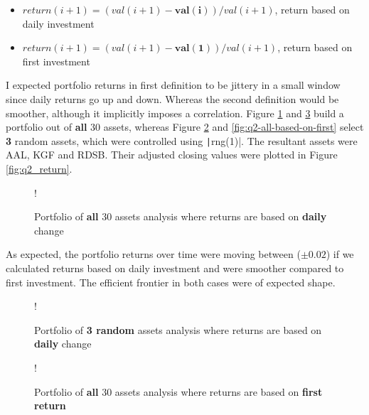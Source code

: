\documentclass[11pt]{article}
\begin{document}
\begin{itemize}
	\item $return(i+1) = (val(i+1) - \bm{val(i)})/val(i+1)$, return based on daily investment
	\item $return(i+1) = (val(i+1) - \bm{val(1)})/val(i+1)$, return based on first investment
\end{itemize}

I expected portfolio returns in first definition to be jittery in a small window since daily returns
go up and down. Whereas the second definition would be smoother, although it implicitly imposes a correlation. 
Figure \ref{fig:q2-all-assets-all-based-on-daily} and \ref{fig:q2-all-assets-all-based-on-first} build a portfolio out of \textbf{all} 30 assets, whereas
Figure \ref{fig:q2-all-based-on-daily} and \ref{fig:q2-all-based-on-first} select \textbf{3} random assets,
which were controlled using \texttt|rng(1)|. The resultant assets were AAL, KGF and RDSB.
Their adjusted closing values were plotted in Figure \ref{fig:q2_return}.

\begin{figure}[!h]
   \centering 
 	\resizebox {\textwidth} {!} { }
    \caption{Portfolio of \textbf{all} 30 assets analysis where returns are based on \textbf{daily} change}
	\label{fig:q2-all-assets-all-based-on-daily}
	\vspace{-0.3cm}
\end{figure}

As expected, the portfolio returns over time were moving between ($\pm0.02$) if we calculated returns
based on daily investment and were smoother compared to first investment. The efficient frontier in
both cases were of expected shape.

\begin{figure}[!h]
   \centering 
 	\resizebox {\textwidth} {!} { }
    \caption{Portfolio of \textbf{3 random} assets analysis where returns are based on \textbf{daily} change}
	\label{fig:q2-all-based-on-daily}
	\vspace{-0.3cm}
\end{figure}

\begin{figure}[!h]
   \centering 
 	\resizebox {\textwidth} {!} { }
    \caption{Portfolio of \textbf{all} 30 assets analysis where returns are based on \textbf{first return}}
	\label{fig:q2-all-assets-all-based-on-first}
	\vspace{-0.3cm}
\end{figure}
\end{document}
